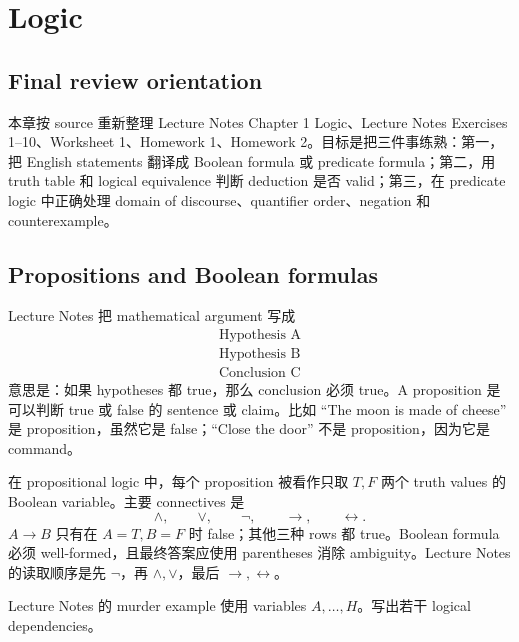 \chapter{Logic}
\label{chap:logic}

\section*{Final review orientation}

本章按 source 重新整理 Lecture Notes Chapter 1 Logic、Lecture Notes Exercises 1--10、Worksheet 1、Homework 1、Homework 2。目标是把三件事练熟：第一，把 English statements 翻译成 Boolean formula 或 predicate formula；第二，用 truth table 和 logical equivalence 判断 deduction 是否 valid；第三，在 predicate logic 中正确处理 domain of discourse、quantifier order、negation 和 counterexample。

\section{Propositions and Boolean formulas}

Lecture Notes 把 mathematical argument 写成
\[
\begin{array}{c}
\text{Hypothesis A}\\
\text{Hypothesis B}\\
\hline
\text{Conclusion C}
\end{array}
\]
意思是：如果 hypotheses 都 true，那么 conclusion 必须 true。A proposition 是可以判断 true 或 false 的 sentence 或 claim。比如 ``The moon is made of cheese'' 是 proposition，虽然它是 false；``Close the door'' 不是 proposition，因为它是 command。

在 propositional logic 中，每个 proposition 被看作只取 \(T,F\) 两个 truth values 的 Boolean variable。主要 connectives 是
\[
\land,\qquad \lor,\qquad \lnot,\qquad \to,\qquad \leftrightarrow .
\]
\(A\to B\) 只有在 \(A=T,B=F\) 时 false；其他三种 rows 都 true。Boolean formula 必须 well-formed，且最终答案应使用 parentheses 消除 ambiguity。Lecture Notes 的读取顺序是先 \(\lnot\)，再 \(\land,\lor\)，最后 \(\to,\leftrightarrow\)。

\begin{exerciseblock}
Lecture Notes 的 murder example 使用 variables \(A,\ldots,H\)。写出若干 logical dependencies。
\end{exerciseblock}

